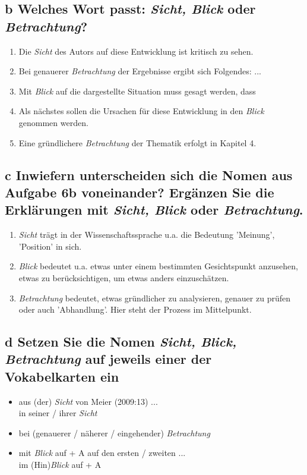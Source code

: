 \documentclass{article}
\begin{document}
	\subsection{\textbf{b} Welches Wort passt: \textit{Sicht, Blick} oder \textit{Betrachtung}?}
	\begin{enumerate}
		\item{Die \textit{Sicht} des Autors auf diese Entwicklung ist kritisch zu sehen.}
		\item{Bei genauerer \textit{Betrachtung} der Ergebnisse ergibt sich Folgendes: ...}
		\item{Mit \textit{Blick} auf die dargestellte Situation muss gesagt werden, dass}
		\item{Als nächstes sollen die Ursachen für diese Entwicklung in den \textit{Blick} genommen werden.}
		\item{Eine gründlichere \textit{Betrachtung} der Thematik erfolgt in Kapitel 4.}
	\end{enumerate}
	\subsection{\textbf{c} Inwiefern unterscheiden sich die Nomen aus Aufgabe 6b voneinander? Ergänzen Sie die Erklärungen mit \textit{Sicht, Blick} oder \textit{Betrachtung}.}
	\begin{enumerate}
		\item{\textit{Sicht} trägt in der Wissenschaftssprache u.a. die Bedeutung 'Meinung', 'Position' in sich.}
		\item{\textit{Blick} bedeutet u.a. etwas unter einem bestimmten Gesichtspunkt anzusehen, etwas zu berücksichtigen, um etwas anders einzuschätzen.}
		\item{\textit{Betrachtung} bedeutet, etwas gründlicher zu analysieren, genauer zu prüfen oder auch 'Abhandlung'. Hier steht der Prozess im Mittelpunkt.}
	\end{enumerate}
	\subsection{\textbf{d} Setzen Sie die Nomen \textit{Sicht, Blick, Betrachtung} auf jeweils einer der Vokabelkarten ein}
	\begin{itemize}
		\item{aus (der) \textit{Sicht} von Meier (2009:13) ... \\ in seiner / ihrer \textit{Sicht}}
		\item{bei (genauerer / näherer / eingehender) \textit{Betrachtung}}
		\item{mit \textit{Blick} auf + A auf den ersten / zweiten ... \\ im (Hin)\textit{Blick} auf + A}	
	\end{itemize}
\end{document}
